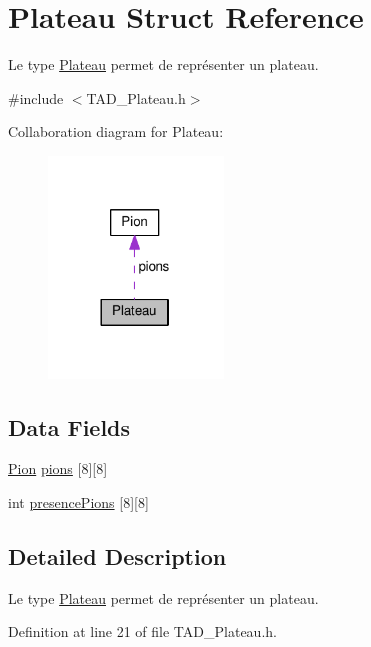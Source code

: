 \hypertarget{struct_plateau}{}\section{Plateau Struct Reference}
\label{struct_plateau}


Le type \hyperlink{struct_plateau}{Plateau} permet de représenter un plateau.  




{\ttfamily \#include $<$T\+A\+D\+\_\+\+Plateau.\+h$>$}



Collaboration diagram for Plateau\+:
\nopagebreak
\begin{figure}[H]
\begin{center}
\leavevmode
\includegraphics[width=132pt]{struct_plateau__coll__graph}
\end{center}
\end{figure}
\subsection*{Data Fields}
\begin{DoxyCompactItemize}
\item 
\hyperlink{struct_pion}{Pion} \hyperlink{struct_plateau_aa14649bf1b37b316f42ffcb79c1951a5}{pions} \mbox{[}8\mbox{]}\mbox{[}8\mbox{]}
\item 
int \hyperlink{struct_plateau_a5df6e631fe34def5ff04a0b4dd233ae5}{presence\+Pions} \mbox{[}8\mbox{]}\mbox{[}8\mbox{]}
\end{DoxyCompactItemize}


\subsection{Detailed Description}
Le type \hyperlink{struct_plateau}{Plateau} permet de représenter un plateau. 

Definition at line 21 of file T\+A\+D\+\_\+\+Plateau.\+h.



